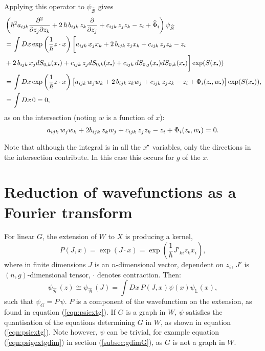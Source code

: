     Applying this operator to \( \psi_{\widehat{\mathcal{B}}}\) gives
    \begin{align*}
    &\left(\hslash^2 a_{ijk} \frac{\partial^2}{\partial z_j \partial z_k} +  2 \,\hslash \,  b_{ijk} \,  z_k \frac{\partial}{\partial z_j} + c_{ijk}\, z_j z_k - z_i  + \widehat{\Phi}_i \right) \psi_{\widehat{\mathcal{B}}}\\ 
    &= \int Dx  \exp\left( \frac{1}{\hslash} z \cdot x\right) \bigg[  a_{ijk} \, x_j x_k + 2  \, b_{ijk}\, z_j x_k   + c_{ijk}\, z_j z_k   - z_i  \\
    & + 2 \,b_{ijk} \, x_j dS_{0,k}(x_{\sbt}) + c_{ijk}\, z_j dS_{0,k}(x_{\sbt}) + c_{ijk} \,  dS_{0,j}(x_{\sbt}) dS_{0,k}(x_{\sbt})\bigg]  \exp(S(x_{\sbt}))\\
    &= \int Dx \exp\left( \frac{1}{\hslash} z \cdot x\right) \big[  a_{ijk}\, w_j w_k + 2\,  b_{ijk}\, z_k w_j+ c_{ijk}\, z_j z_k - z_i   +  \Phi_i(z_{\sbt},w_{\sbt})  \big] \exp(S(x_{\sbt})), \\
    &= \int Dx\, 0 = 0,
    \end{align*}
    as on the intersection (noting \(w\) is a function of \(x\)): 
    \[  a_{ijk}\, w_j w_k + 2 b_{ijk}\, z_k w_j+ c_{ijk}\, z_j z_k - z_i   +  \Phi_i(z_{\sbt},w_{\sbt})   = 0.\]
    
    \begin{rem}
    Note that although the integral is in all the \(x^{\sbt}\) variables, only the directions in the intersection contribute. In this case this occurs for  \(g\) of the \(x\). 
    \end{rem}

    
    
    \section{Reduction of wavefunctions as a Fourier transform}
    
    
    For linear \(G\), the extension of \(W\) to \( X\) is producing a kernel, \[P(J,x) = \exp(J\cdot x) =  \exp\left( \frac{1}{\hslash }J'_{ki}z_k x_i  \right) ,\] where in finite dimensions \(J\) is an \( n\)-dimensional vector, dependent on \(z_i\), \(J'\) is \((n,g)\)-dimensional tensor, \(\cdot\) denotes contraction. Then:
    \[  \psi_{\widehat{\mathcal{B}}}\,(z) \cong \psi_{\widehat{\mathcal{B}}}\,(J) =\int Dx\,P(J,x) \psi(x) \psi_{\mathbb{L}}(x),\]
    such that \( \psi_{G} = P\, \psi\). \(P\) is a component of the wavefunction on the extension, as found in equation (\ref{eqn:psiextg}).  If \(G\) is a graph in \(W\), \( \psi\) satisfies the quantisation of the equations determining \(G\) in \(W\), as shown in equation (\ref{eqn:psiextg}). Note however, \( \psi\) can be trivial, for example equation (\ref{eqn:psigextgdim}) in section (\ref{subsec:gdimG}), as \(G\) is not a graph in \(W\). 
    
